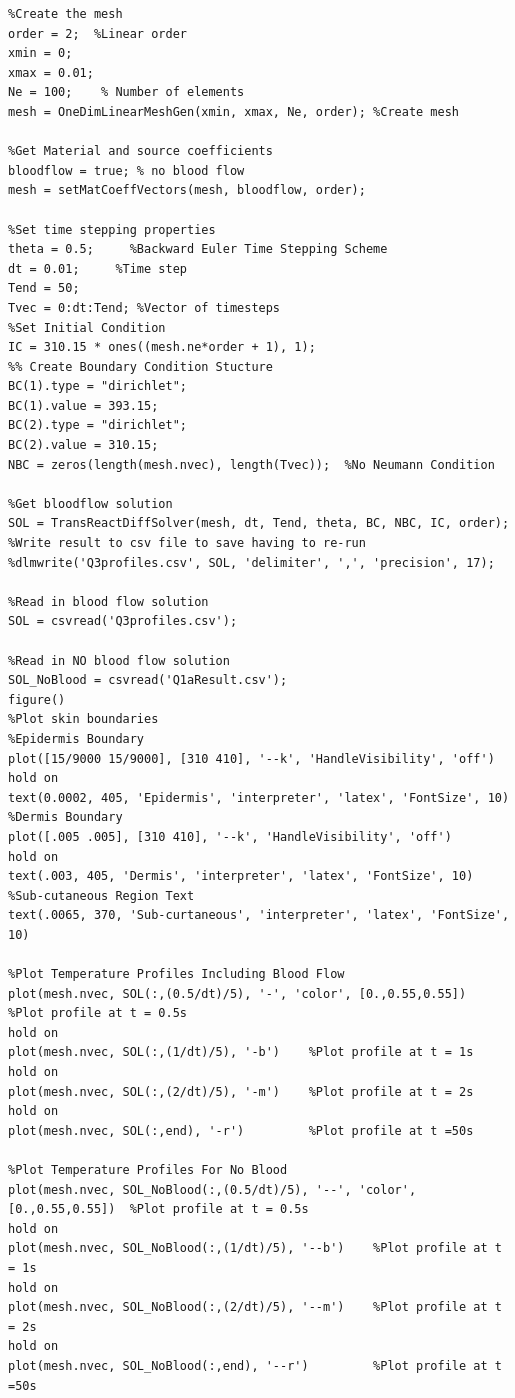 \documentclass[11pt]{article}
\begin{document}
\begin{appendices}
\begin{lstlisting}
%Create the mesh
order = 2;  %Linear order
xmin = 0;
xmax = 0.01;
Ne = 100;    % Number of elements
mesh = OneDimLinearMeshGen(xmin, xmax, Ne, order); %Create mesh

%Get Material and source coefficients
bloodflow = true; % no blood flow
mesh = setMatCoeffVectors(mesh, bloodflow, order);

%Set time stepping properties
theta = 0.5;     %Backward Euler Time Stepping Scheme
dt = 0.01;     %Time step
Tend = 50;
Tvec = 0:dt:Tend; %Vector of timesteps
%Set Initial Condition
IC = 310.15 * ones((mesh.ne*order + 1), 1);
%% Create Boundary Condition Stucture
BC(1).type = "dirichlet";
BC(1).value = 393.15;
BC(2).type = "dirichlet";
BC(2).value = 310.15;
NBC = zeros(length(mesh.nvec), length(Tvec));  %No Neumann Condition

%Get bloodflow solution
SOL = TransReactDiffSolver(mesh, dt, Tend, theta, BC, NBC, IC, order);
%Write result to csv file to save having to re-run
%dlmwrite('Q3profiles.csv', SOL, 'delimiter', ',', 'precision', 17);

%Read in blood flow solution
SOL = csvread('Q3profiles.csv');

%Read in NO blood flow solution
SOL_NoBlood = csvread('Q1aResult.csv');
figure()
%Plot skin boundaries
%Epidermis Boundary
plot([15/9000 15/9000], [310 410], '--k', 'HandleVisibility', 'off')
hold on
text(0.0002, 405, 'Epidermis', 'interpreter', 'latex', 'FontSize', 10)
%Dermis Boundary
plot([.005 .005], [310 410], '--k', 'HandleVisibility', 'off')
hold on
text(.003, 405, 'Dermis', 'interpreter', 'latex', 'FontSize', 10)
%Sub-cutaneous Region Text
text(.0065, 370, 'Sub-curtaneous', 'interpreter', 'latex', 'FontSize', 10)

%Plot Temperature Profiles Including Blood Flow
plot(mesh.nvec, SOL(:,(0.5/dt)/5), '-', 'color', [0.,0.55,0.55])  %Plot profile at t = 0.5s
hold on
plot(mesh.nvec, SOL(:,(1/dt)/5), '-b')    %Plot profile at t = 1s
hold on
plot(mesh.nvec, SOL(:,(2/dt)/5), '-m')    %Plot profile at t = 2s
hold on
plot(mesh.nvec, SOL(:,end), '-r')         %Plot profile at t =50s

%Plot Temperature Profiles For No Blood
plot(mesh.nvec, SOL_NoBlood(:,(0.5/dt)/5), '--', 'color', [0.,0.55,0.55])  %Plot profile at t = 0.5s
hold on
plot(mesh.nvec, SOL_NoBlood(:,(1/dt)/5), '--b')    %Plot profile at t = 1s
hold on
plot(mesh.nvec, SOL_NoBlood(:,(2/dt)/5), '--m')    %Plot profile at t = 2s
hold on
plot(mesh.nvec, SOL_NoBlood(:,end), '--r')         %Plot profile at t =50s


\end{lstlisting}
\end{appendices}
\end{document}
